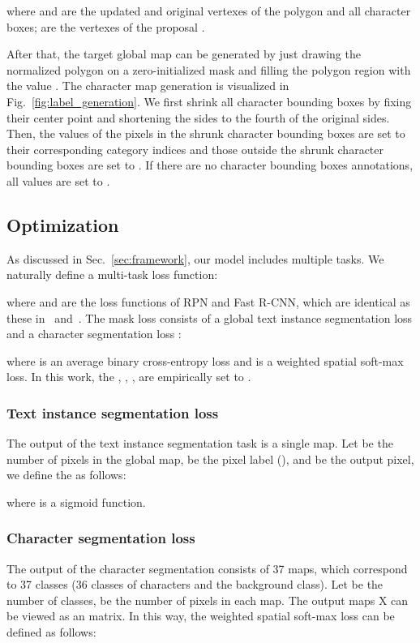 \documentclass[runningheads]{llncs}
\begin{document}
where  and  are the updated and original vertexes of the polygon and all character boxes;  are the vertexes of the proposal .

After that, the target global map can be generated by just drawing the normalized polygon on a zero-initialized mask and filling the polygon region with the value . 
The character map generation is visualized in Fig.~\ref{fig:label_generation}. We first shrink all character bounding boxes by fixing their center point and shortening the sides to the fourth of the original sides. Then, the values of the pixels in the shrunk character bounding boxes are set to their corresponding category indices and those outside the shrunk character bounding boxes are set to . If there are no character bounding boxes annotations, all values are set to .

\subsection{Optimization}
As discussed in Sec.~\ref{sec:framework}, our model includes multiple tasks. We naturally define a multi-task loss function:

where  and  are the loss functions of RPN and Fast R-CNN, which are identical as these in~\cite{ren2015faster} and~\cite{fastrcnn}. 
The mask loss  consists of a global text instance segmentation loss  and a character segmentation loss :

where  is an average binary cross-entropy loss and  is a weighted spatial soft-max loss. In this work, the , , , are empirically set to .

\subsubsection{Text instance segmentation loss}
The output of the text instance segmentation task is a single map. Let  be the number of pixels in the global map,  be the pixel label (), and  be the output pixel, we define the  as follows:

where  is a sigmoid function.


\subsubsection{Character segmentation loss}
The output of the character segmentation consists of 37 maps, which correspond to 37 classes (36 classes of characters and the background class). Let  be the number of classes,  be the number of pixels in each map. The output maps X can be viewed as an  matrix. In this way, the weighted spatial soft-max loss can be defined as follows:
\end{document}
